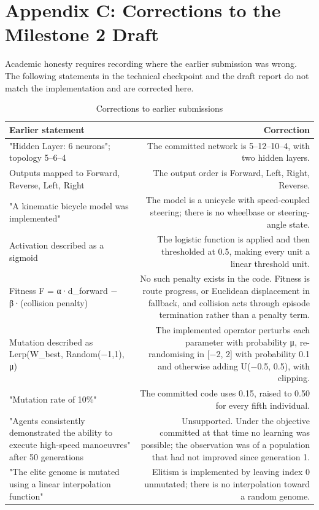 \documentclass[conference]{IEEEtran}
\begin{document}
\section*{Appendix C: Corrections to the Milestone 2 Draft}

\label{sec:appC}

Academic honesty requires recording where the earlier submission was wrong. The following statements in the technical checkpoint and the draft report do not match the implementation and are corrected here.

\begin{table}[!t]
\caption{Corrections to earlier submissions}
\label{tab:corrections}
\centering
\footnotesize
\begin{tabular}{lr}
\toprule
Earlier statement & Correction \\
\midrule
"Hidden Layer: 6 neurons"; topology 5–6–4 & The committed network is 5–12–10–4, with two hidden layers. \\
Outputs mapped to Forward, Reverse, Left, Right & The output order is Forward, Left, Right, Reverse. \\
"A kinematic bicycle model was implemented" & The model is a unicycle with speed-coupled steering; there is no wheelbase or steering-angle state. \\
Activation described as a sigmoid & The logistic function is applied and then thresholded at 0.5, making every unit a linear threshold unit. \\
Fitness F = α·d\_forward − β·(collision penalty) & No such penalty exists in the code. Fitness is route progress, or Euclidean displacement in fallback, and collision acts through episode termination rather than a penalty term. \\
Mutation described as Lerp(W\_best, Random(−1,1), μ) & The implemented operator perturbs each parameter with probability μ, re-randomising in [−2, 2] with probability 0.1 and otherwise adding U(−0.5, 0.5), with clipping. \\
"Mutation rate of 10\%" & The committed code uses 0.15, raised to 0.50 for every fifth individual. \\
"Agents consistently demonstrated the ability to execute high-speed manoeuvres" after 50 generations & Unsupported. Under the objective committed at that time no learning was possible; the observation was of a population that had not improved since generation 1. \\
"The elite genome is mutated using a linear interpolation function" & Elitism is implemented by leaving index 0 unmutated; there is no interpolation toward a random genome. \\
\bottomrule
\end{tabular}
\end{table}
\end{document}
